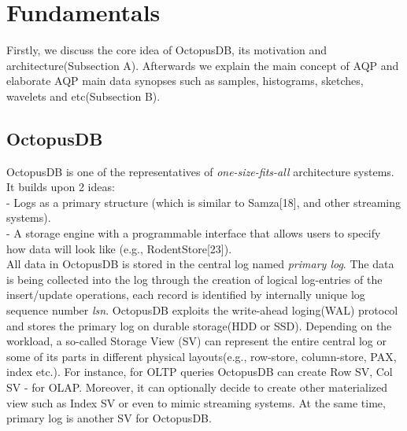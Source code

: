 \documentclass[10pt, conference, compsocconf]{IEEEtran}
\begin{document}
\section{Fundamentals}
Firstly, we discuss the core idea of OctopusDB, its motivation and  architecture(Subsection A). Afterwards we explain the main concept of AQP and elaborate AQP main data synopses such as samples, histograms, sketches, wavelets and etc(Subsection B).
\subsection{OctopusDB}
OctopusDB is one of the representatives of \textit{one-size-fits-all} architecture systems. %
It builds upon 2 ideas:\\
- Logs as a primary structure (which is similar to Samza[18], and other streaming systems).\\
- A storage engine with a programmable interface that allows users to specify how data will look like (e.g., RodentStore[23]).\\
All data in OctopusDB is stored in the central log named \textit{primary log}. The data is being collected into the log through the creation of logical log-entries of the insert/update operations, each record is identified by internally unique log sequence number \textit{lsn}. OctopusDB exploits the write-ahead loging(WAL) protocol and stores the primary log on durable storage(HDD or SSD). Depending on the workload, a so-called Storage View (SV) can represent the entire central log or some of its parts in different physical layouts(e.g., row-store, column-store, PAX, index etc.). 
For instance, for OLTP queries OctopusDB can create Row SV, Col SV - for OLAP. Moreover,  it can optionally decide to create other materialized view such as Index SV or even to mimic streaming systems. At the same time, primary log is another SV for OctopusDB.  
\end{document}
